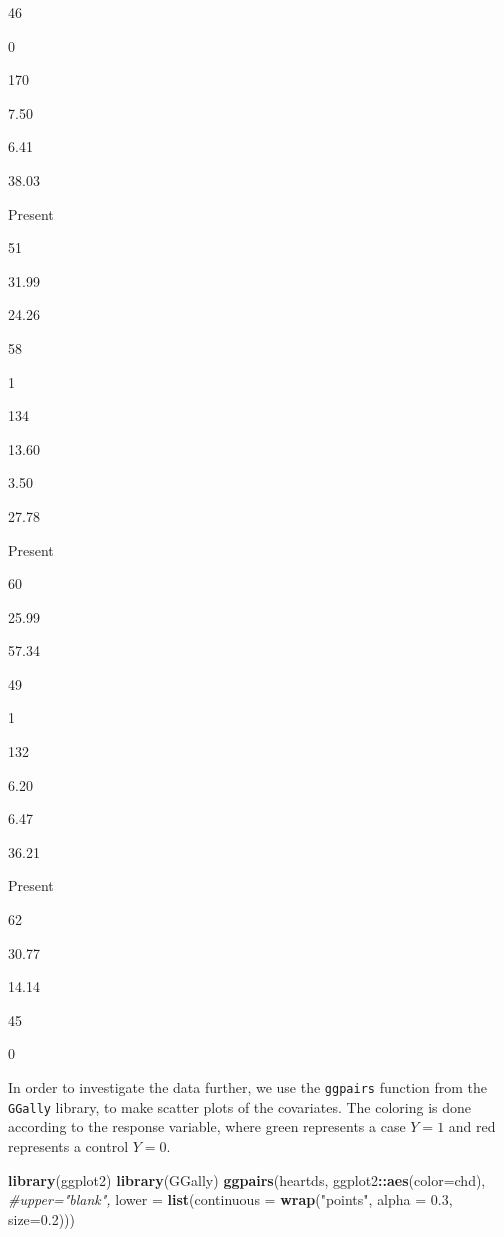 \documentclass[10pt,ignorenonframetext,]{beamer}
\newenvironment{Shaded}{\begin{snugshade}}{\end{snugshade}}
\newcommand{\KeywordTok}[1]{\textcolor[rgb]{0.13,0.29,0.53}{\textbf{#1}}}
\newcommand{\DataTypeTok}[1]{\textcolor[rgb]{0.13,0.29,0.53}{#1}}
\newcommand{\FloatTok}[1]{\textcolor[rgb]{0.00,0.00,0.81}{#1}}
\newcommand{\StringTok}[1]{\textcolor[rgb]{0.31,0.60,0.02}{#1}}
\newcommand{\CommentTok}[1]{\textcolor[rgb]{0.56,0.35,0.01}{\textit{#1}}}
\newcommand{\OperatorTok}[1]{\textcolor[rgb]{0.81,0.36,0.00}{\textbf{#1}}}
\newcommand{\NormalTok}[1]{#1}
\begin{document}
\begin{frame}[fragile]
46

0

170

7.50

6.41

38.03

Present

51

31.99

24.26

58

1

134

13.60

3.50

27.78

Present

60

25.99

57.34

49

1

132

6.20

6.47

36.21

Present

62

30.77

14.14

45

0

\normalsize

\end{frame}

\begin{frame}[fragile]

In order to investigate the data further, we use the \texttt{ggpairs}
function from the \texttt{GGally} library, to make scatter plots of the
covariates. The coloring is done according to the response variable,
where green represents a case \(Y=1\) and red represents a control
\(Y=0\).

\end{frame}

\begin{frame}[fragile]

\begin{Shaded}
\begin{Highlighting}[]
\KeywordTok{library}\NormalTok{(ggplot2)}
\KeywordTok{library}\NormalTok{(GGally)}
\KeywordTok{ggpairs}\NormalTok{(heartds, ggplot2}\OperatorTok{::}\KeywordTok{aes}\NormalTok{(}\DataTypeTok{color=}\NormalTok{chd), }\CommentTok{#upper="blank",  }
        \DataTypeTok{lower =} \KeywordTok{list}\NormalTok{(}\DataTypeTok{continuous =} \KeywordTok{wrap}\NormalTok{(}\StringTok{"points"}\NormalTok{, }\DataTypeTok{alpha =} \FloatTok{0.3}\NormalTok{, }\DataTypeTok{size=}\FloatTok{0.2}\NormalTok{)))}
\end{Highlighting}
\end{Shaded}

\end{frame}
\end{document}
